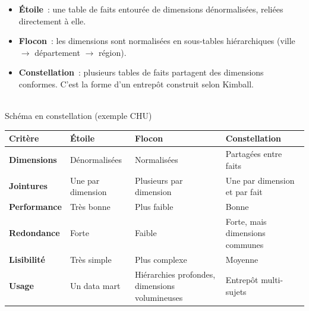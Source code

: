 \begin{itemize}
	\item \textbf{Étoile}~: une table de faits entourée de dimensions dénormalisées, reliées directement à elle.
	\item \textbf{Flocon}~: les dimensions sont normalisées en sous-tables hiérarchiques (ville $\rightarrow$ département $\rightarrow$ région).
	\item \textbf{Constellation}~: plusieurs tables de faits partagent des dimensions conformes. C'est la forme d'un entrepôt construit selon Kimball.
\end{itemize}

\begin{center}
\\[0.1cm]
{\small Schéma en constellation (exemple CHU)}
\end{center}

\begin{center}
\begin{tabularx}{\textwidth}{>{\bfseries}l >{\raggedright\arraybackslash}X >{\raggedright\arraybackslash}X >{\raggedright\arraybackslash}X}
\toprule
Critère & Étoile & Flocon & Constellation \\
\midrule
Dimensions & Dénormalisées & Normalisées & Partagées entre faits \\
Jointures & Une par dimension & Plusieurs par dimension & Une par dimension et par fait \\
Performance & Très bonne & Plus faible & Bonne \\
Redondance & Forte & Faible & Forte, mais dimensions communes \\
Lisibilité & Très simple & Plus complexe & Moyenne \\
Usage & Un data mart & Hiérarchies profondes, dimensions volumineuses & Entrepôt multi-sujets \\
\bottomrule
\end{tabularx}
\end{center}

